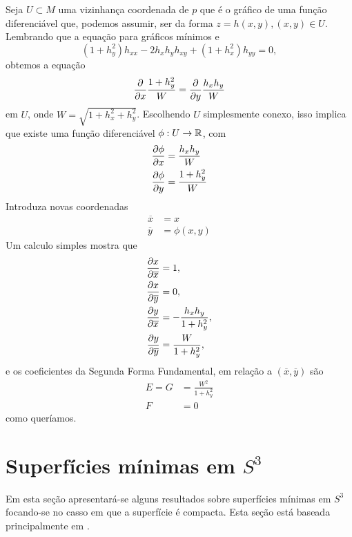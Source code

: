 \begin{demonstracao}
	Seja $U \subset M$ uma vizinhança coordenada de $p$ que é o gráfico de uma função diferenciável que, podemos assumir, ser da forma $z = h(x,y), (x,y) \in U$.
	Lembrando que a equação para gráficos mínimos e
	\begin{equation*}
	(1 + h_y^2) h_{xx} - 2 h_x h_y h_{xy} + (1 + h_x^2) h_{yy} = 0,
	\end{equation*}
	obtemos a equação
	\begin{equation*}
	\frac{\partial}{\partial x} \frac{1 + h_y^2}{W} = \frac{\partial}{\partial y} \frac{h_x h_y}{W}
	\end{equation*}
	em $U$, onde $W = \sqrt{1 + h_x^2 + h_y^2}$. Escolhendo $U$ simplesmente conexo, isso implica que existe uma função diferenciável $\phi: U \rightarrow \mathbb{R}$, com
	\begin{align*}
	\frac{\partial \phi}{\partial x} &= \frac{h_x h_y}{W} \\
	\frac{\partial \phi}{\partial y} &= \frac{1 + h_y^2}{W}
	\end{align*}
	Introduza novas coordenadas
	\begin{align*}
	\overline{x} &= x \\
	\overline{y} &= \phi(x,y)
	\end{align*}
	Um calculo simples mostra que
	\begin{align*}
	\frac{\partial x}{\partial \overline{x}} &= 1, \\
	\frac{\partial x}{\partial \overline{y}} &= 0, \\
	\frac{\partial y}{\partial \overline{x}} &= -\frac{h_x h_y}{1 + h_y^2}, \\
	\frac{\partial y}{\partial \overline{y}} &= \frac{W}{1 + h_y^2},
	\end{align*}
	e os coeficientes da Segunda Forma Fundamental, em relação a $(\overline{x}, \overline{y})$ são
	\begin{align*}
	E = G &= \frac{W^2}{1 + h_y^2} \\
	F &= 0
	\end{align*}
	como queríamos.
\end{demonstracao}

\section{Superfícies mínimas em $S^3$}

Em esta seção apresentará-se alguns resultados sobre superfícies mínimas em $S^3$ focando-se no casso em que a superfície é compacta. Esta seção está baseada principalmente em \cite{Brendle2013}.

